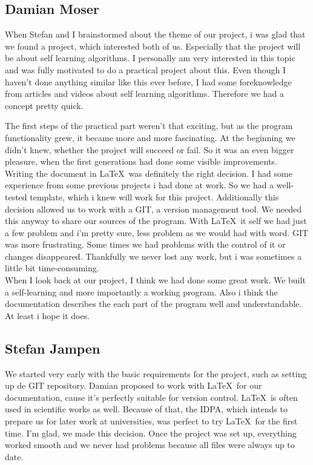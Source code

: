 \subsection{Damian Moser}
When Stefan and I brainstormed about the theme of our project, i was glad that we found a project, which interested both of us. Especially that the project will be about self learning algorithms. I personally am very interested in this topic and was fully motivated to do a practical project about this. Even though I haven't done anything similar like this ever before, I had some foreknowledge from articles and videos about self learning algorithms. Therefore we had a concept pretty quick. 

The first steps of the practical part weren't that exciting, but as the program functionality grew, it became more and more fascinating. At the beginning we didn't knew, whether the project will succeed or fail. So it was an even bigger pleasure, when the first generations had done some visible improvements. \\

Writing the document in \LaTeX\ was definitely the right decision. I had some experience from some previous projects i had done at work. So we had a well-tested template, which i knew will work for this project. Additionally this decision allowed us to work with a GIT, a version management tool. We needed this anyway to share our sources of the program. With \LaTeX\ it self we had just a few problem and i'm pretty sure, less problem as we would had with word. GIT was more frustrating. Some times we had problems with the control of it or changes disappeared. Thankfully we never lost any work, but i was sometimes a little bit time-consuming.\\

When I look back at our project, I think we had done some great work. We built a self-learning and more importantly a working program. Also i think the documentation describes the each part of the program well and understandable. At least i hope it does.

\subsection{Stefan Jampen}
We started very early with the basic requirements for the project, such as setting up de GIT repository.
Damian proposed to work with \LaTeX\ for our documentation, cause it's perfectly suitable for version control. \LaTeX\ is often used in scientific works as well. Because of that, the IDPA, which intends to prepare us for later work at universities, was perfect to try \LaTeX\ for the first time. I'm glad, we made this decision. Once the project was set up, everything worked smooth and we never had problems because all files were always up to date.\\

